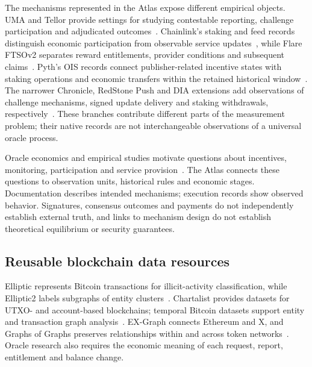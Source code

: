 The mechanisms represented in the Atlas expose different empirical objects. UMA and Tellor provide settings for studying contestable reporting, challenge participation and adjudicated outcomes~\cite{uma2026,tellorDisputes2026}. Chainlink's staking and feed records distinguish economic participation from observable service updates~\cite{chainlinkstaking2026}, while Flare FTSOv2 separates reward entitlements, provider conditions and subsequent claims~\cite{flareFTSO2026}. Pyth's OIS records connect publisher-related incentive states with staking operations and economic transfers within the retained historical window~\cite{pythOIS2026}. The narrower Chronicle, RedStone Push and DIA extensions add observations of challenge mechanisms, signed update delivery and staking withdrawals, respectively~\cite{chronicleDocs2026,redstoneDocs2026,diaDocs2026}. These branches contribute different parts of the measurement problem; their native records are not interchangeable observations of a universal oracle process.

Oracle economics and empirical studies motivate questions about incentives, monitoring, participation and service provision~\cite{cong2025oracleprimer,liu2021firstlook,kaleem2021pythia,cong2026integration}. The Atlas connects these questions to observation units, historical rules and economic stages. Documentation describes intended mechanisms; execution records show observed behavior. Signatures, consensus outcomes and payments do not independently establish external truth, and links to mechanism design do not establish theoretical equilibrium or security guarantees.



\subsection{Reusable blockchain data resources}

Elliptic represents Bitcoin transactions for illicit-activity classification, while Elliptic2 labels subgraphs of entity clusters~\cite{weber2019elliptic,bellei2024elliptic2}. Chartalist provides datasets for UTXO- and account-based blockchains; temporal Bitcoin datasets support entity and transaction graph analysis~\cite{shamsi2022chartalist,coquide2025orbitaal,schnoering2025bitcoin}. EX-Graph connects Ethereum and X, and Graphs of Graphs preserves relationships within and across token networks~\cite{wang2024exgraph,luo2024multichain}. Oracle research also requires the economic meaning of each request, report, entitlement and balance change.

